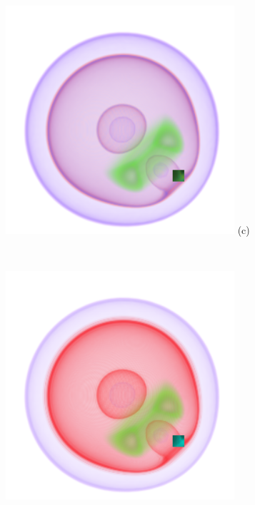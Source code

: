 \documentclass[twoside,twocolumn,10pt]{article}
\begin{document}
\begin{figure}[t]
	\begin{minipage}{.1\textwidth}
		\centering
		\includegraphics[width=1\linewidth]{nucleon_2_color_crop}
		(c)%
		\label{fig:nucleon_2_color}
	\end{minipage}~
	\begin{minipage}{.1\textwidth}
		\centering
		\includegraphics[width=1\linewidth]{nucleon_2_alpha_crop}

\end{minipage}
\end{figure}
\end{document}
